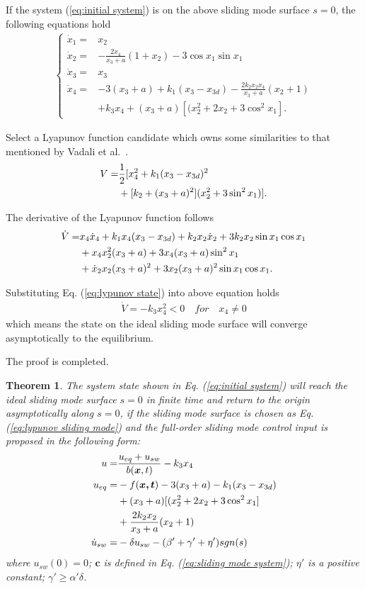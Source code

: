 \documentclass[conference]{IEEEtran}
\theoremstyle{plain}
\newtheorem{mythm}{Theorem}
\begin{document}
\begin{IEEEproof}
If the system (\ref{eq:initial system}) is on the above sliding mode surface $s=0$, the following equations hold
\begin{align}
\begin{cases}
\dot x_1 =& x_2\\
\dot x_2 =& -\frac{2x_4}{x_3+a}(1+x_2)-3\cos{x_1}\sin{x_1}\\
\dot x_3 =& x_3\\
\dot x_4 =& -3(x_3+a)+k_1(x_3-x_{3d})-\frac{2k_2x_2x_4}{x_3+a}(x_2+1)\\
&+ k_3x_4+ (x_3 +a)[(x_2^2+2x_2+3\cos^2{x_1}].
\end{cases}\label{eq:lypunov state}
\end{align}\par
Select a Lyapunov function candidate which owns some similarities to that mentioned by Vadali et al.~\cite{Vadali1991Feedback1}.
\begin{align}
V =& \frac{1}{2}[x_4^2+k_1(x_3-x_{3d})^2\notag\\
&+[k_2+(x_3+a)^2](x_2^2+3\sin^2 x_1)].
\end{align}\par
The derivative of the Lyapunov function follows
\begin{align}
\dot V= & x_4\dot x_4+k_1x_4(x_3-x_{3d})+k_2x_2\dot x_2+3k_2x_2\sin x_1\cos x_1\notag\\
        & +x_4x_2^2(x_3+a)+3x_4(x_3+a)\sin^2 x_1 \notag\\&+ \dot x_2x_2(x_3+a)^2 + 3x_2(x_3+a)^2\sin x_1\cos x_1.\notag
\end{align}\par
Substituting Eq. (\ref{eq:lypunov state}) into above equation holds
\begin{align}
\dot V= -k_3x_4^2 < 0\quad for\quad x_4\neq 0
\end{align}
which means the state on the ideal sliding mode surface will converge asymptotically to the equilibrium.\par
The proof is completed.
\end{IEEEproof}
\begin{mythm}\label{thm:3}
The system state shown in Eq. (\ref{eq:initial system}) will reach the ideal sliding mode surface $s=0$ in finite time and return to the origin asymptotically along $s=0$, if the sliding mode surface is chosen as Eq. (\ref{eq:lypunov sliding mode}) and the full-order sliding mode control input is proposed in the following form:
\begin{align}
u =& \frac{u_{eq}+u_{sw}}{b(\bm{x},t)}- k_3x_4\notag\\
u_{eq}=&-f(\bm{x,t})-3(x_3+a)-k_1(x_3-x_{3d}) \notag\\
&+ (x_3 +a)[(x_2^2+2x_2+3\cos^2{x_1}]\notag\\
&+\frac{2k_2x_2}{x_3+a}(x_2+1)\notag\\
\dot u_{sw}=&-\delta u_{sw}-(\beta'+\gamma'+\eta')sgn(s)\notag
\end{align}
where $u_{sw}(0) = 0$; $\bm{c}$ is defined in Eq. (\ref{eq:sliding mode system}); $\eta'$ is a positive constant; $\gamma'\ge\alpha' \delta$.
\end{mythm}
\end{document}
